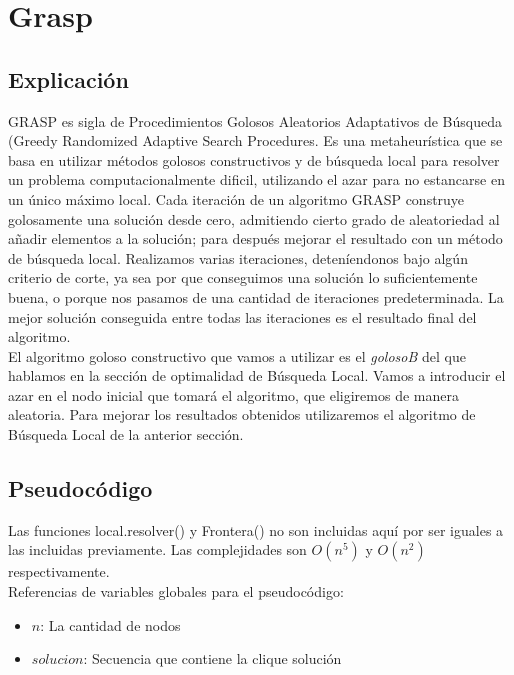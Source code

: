 \section{Grasp}

\subsection{Explicación}
GRASP es sigla de Procedimientos Golosos Aleatorios Adaptativos de Búsqueda (Greedy Randomized Adaptive Search Procedures. Es una metaheurística que se basa en utilizar métodos golosos constructivos y de búsqueda local para resolver un problema computacionalmente dificil, utilizando el azar para no estancarse en un único máximo local. Cada iteración de un algoritmo GRASP construye golosamente una solución desde cero, admitiendo cierto grado de aleatoriedad al añadir elementos a la solución; para después mejorar el resultado con un método de búsqueda local. Realizamos varias iteraciones, deteníendonos bajo algún criterio de corte, ya sea por que conseguimos una solución lo suficientemente buena, o porque nos pasamos de una cantidad de iteraciones predeterminada. La mejor solución conseguida entre todas las iteraciones es el resultado final del algoritmo. \\

El algoritmo goloso constructivo que vamos a utilizar es el \textit{golosoB} del que hablamos en la sección de optimalidad de Búsqueda Local. Vamos a introducir el azar en el nodo inicial que tomará el algoritmo, que eligiremos de manera aleatoria. Para mejorar los resultados obtenidos utilizaremos el algoritmo de Búsqueda Local de la anterior sección.

\subsection{Pseudocódigo}

Las funciones local.resolver() y Frontera() no son incluidas aquí por ser iguales a las incluidas previamente. Las complejidades son $O(n^5)$ y $O(n^2)$ respectivamente. \\

Referencias de variables globales para el pseudocódigo:
\begin{itemize}
    \item $n$: La cantidad de nodos
    \item $solucion$: Secuencia que contiene la clique solución
\end{itemize}

